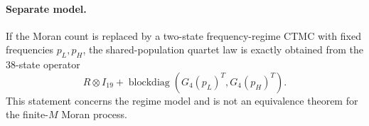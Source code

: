 \paragraph{Separate model.}
If the Moran count is replaced by a two-state frequency-regime CTMC with fixed
frequencies \(p_L,p_H\), the shared-population quartet law is exactly obtained
from the 38-state operator
\[
R\otimes I_{19}+\operatorname{blockdiag}(G_4(p_L)^T,G_4(p_H)^T).
\]
This statement concerns the regime model and is not an equivalence theorem
for the finite-\(M\) Moran process.
